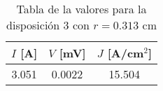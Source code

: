 \begin{table}[h!]
    \centering
\begin{tabular}{ccc}
\toprule
$I$ [A] & $V$ [mV] & $J$ [A/cm$^2$] \\
\midrule
3.051 & 0.0022 & 15.504 \\
\bottomrule
\end{tabular}
    \caption{Tabla de la valores para la disposición 3 con $r=0.313$ cm}
    \label{Tab:VIJ_mini_3}
\end{table}
